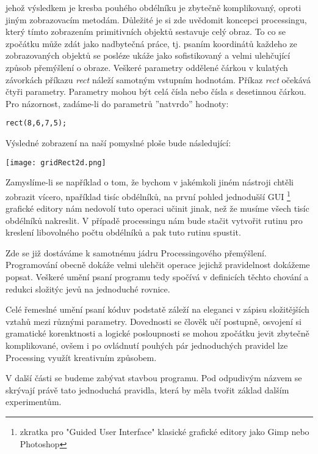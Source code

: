 \documentclass[11pt]{article}
\begin{document}
jehož výsledkem je kresba pouhého obdélníku je zbytečně komplikovaný, oproti jiným zobrazovacím metodám. Důležité je si zde uvědomit koncepci processingu, který tímto zobrazením primitivních objektů sestavuje celý obraz. To co se zpočátku může zdát jako nadbytečná práce, tj. psaním koordinátů každeho ze zobrazovaných objektů se posléze ukáže jako sofistikovaný a velmi ulehčující způsob přemýšlení o obraze. Veškeré parametry oddělené čárkou v kulatých závorkách příkazu {\em rect} náleží samotným vstupním hodnotám. Příkaz {\em rect} očekává čtyři parametry. Parametry mohou být celá čísla nebo čísla s desetinnou čárkou. Pro názornost, zadáme-li do parametrů ''natvrdo'' hodnoty:

\begin{lstlisting}
rect(8,6,7,5);
\end{lstlisting}

Výsledné zobrazení na naší pomyslné ploše bude následující:

\begin{center}
\texttt{[image: gridRect2d.png]}
\end{center}


Zamyslíme-li se například o tom, že bychom v jakémkoli jiném nástroji chtěli zobrazit vícero, npaříklad tisíc obdélníků, na první pohled jednodušší GUI \footnote{zkratka pro "Guided User Interface" klasické grafické editory jako Gimp nebo Photoshop} grafické editory nám nedovolí tuto operaci učinit jinak, než že musíme všech tisíc obdélníků nakreslit. V případě processingu nám bude stačit vytvořit rutinu pro kreslení libovolného počtu obdélníků a pak tuto rutinu spustit.

Zde se již dostáváme k samotnému jádru Processingového přemýšlení. Programování obecně dokáže velmi ulehčit operace jejichž pravidelnost dokážeme popsat. Veškeré umění psaní programu tedy spočívá v definicích těchto chování a redukci složitýc jevů na jednoduché rovnice.

Celé řemeslné umění psaní kóduv podstatě záleží na eleganci v zápisu složitějších vztahů mezi různými parametry. Dovednosti se člověk učí postupně, osvojení si gramatické korenktnosti a logické posloupnosti se mohou zpočátku jevit zbytečně komplikované, ovšem i po ovládnutí pouhých pár jednoduchých pravidel lze Processing využít kreativním způsobem.

V další části se budeme zabývat stavbou programu. Pod odpudivým názvem se skrývají právě tato jednoduchá pravidla, která by měla tvořit základ dalším experimentům.   
\end{document}
